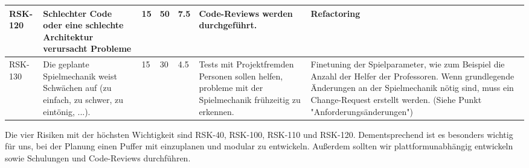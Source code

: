 \begin{landscape}
\begin{longtable}{|p{1.5cm}|p{4.5cm}|p{0.4cm}|p{0.4cm}|p{0.8cm}|p{4.5cm}|p{4.5cm}|}
		\\ \hline

		RSK-120	& Schlechter Code oder eine schlechte Architektur verursacht Probleme
				& 15 	& 50 	& 7.5 	& Code-Reviews werden durchgeführt.
								& Refactoring

		\\ \hline
		
		RSK-130	& Die geplante Spielmechanik weist Schwächen auf (zu einfach, zu schwer, zu eintönig, ...).
				& 15 	& 30 	& 4.5 	& Tests mit Projektfremden Personen sollen helfen, probleme mit der Spielmechanik frühzeitig zu erkennen.
								& Finetuning der Spielparameter, wie zum Beispiel die Anzahl der Helfer der Professoren. Wenn grundlegende Änderungen an der Spielmechanik nötig sind, muss ein Change-Request erstellt werden. (Siehe Punkt "Anforderungsänderungen")

		\\ \hline

	\end{longtable}

	Die vier Risiken mit der höchsten Wichtigkeit sind RSK-40, RSK-100, RSK-110 und RSK-120. Dementsprechend ist es besonders wichtig für uns, bei der Planung einen Puffer mit einzuplanen und modular zu entwickeln. Außerdem sollten wir plattformunabhängig entwickeln sowie Schulungen und Code-Reviews durchführen. 
\end{landscape}
